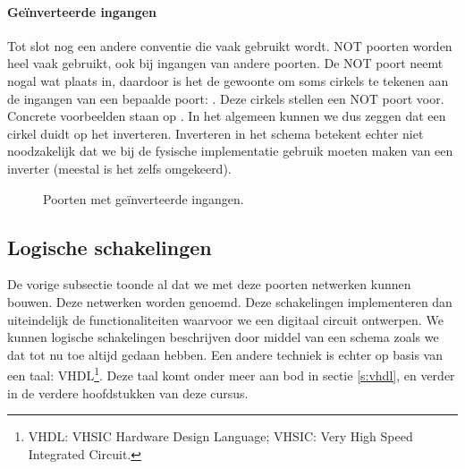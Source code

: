 \paragraph{Ge\"inverteerde ingangen}Tot slot nog een andere conventie die vaak gebruikt wordt. NOT poorten worden heel vaak gebruikt, ook bij ingangen van andere poorten. De NOT poort neemt nogal wat plaats in, daardoor is het de gewoonte om soms cirkels te tekenen aan de ingangen van een bepaalde poort: . Deze cirkels stellen een NOT poort voor. Concrete voorbeelden staan op . In het algemeen kunnen we dus zeggen dat een cirkel duidt op het inverteren. Inverteren in het schema betekent echter niet noodzakelijk dat we bij de fysische implementatie gebruik moeten maken van een inverter (meestal is het zelfs omgekeerd).
\begin{figure}[htb]
\centering
{}
\caption{Poorten met ge\"inverteerde ingangen.}
\end{figure}
\subsection{Logische schakelingen}
De vorige subsectie toonde al dat we met deze poorten netwerken kunnen bouwen. Deze netwerken worden  genoemd. Deze schakelingen implementeren dan uiteindelijk de functionaliteiten waarvoor we een digitaal circuit ontwerpen. We kunnen logische schakelingen beschrijven door middel van een schema zoals we dat tot nu toe altijd gedaan hebben. Een andere techniek is echter op basis van een taal: VHDL\footnote{VHDL: VHSIC Hardware Design Language; VHSIC: Very High Speed Integrated Circuit.}. Deze taal komt onder meer aan bod in sectie \ref{s:vhdl}, en verder in de verdere hoofdstukken van deze cursus.
